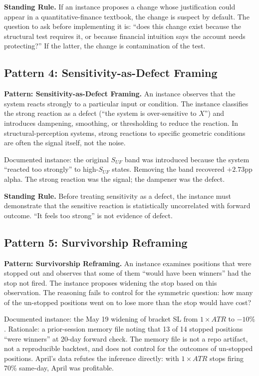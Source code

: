 \documentclass[11pt, a4paper]{article}
\newcommand{\rulebox}[1]{%
  \begin{framed}\noindent\textbf{Standing Rule.} #1\end{framed}}
\newcommand{\patternbox}[2]{%
  \begin{framed}\noindent\textbf{Pattern: #1.} #2\end{framed}}
\theoremstyle{definition}
\begin{document}
\rulebox{If an instance proposes a change whose justification could appear in
a quantitative-finance textbook, the change is suspect by default. The
question to ask before implementing it is: ``does this change exist because
the structural test requires it, or because financial intuition says the
account needs protecting?'' If the latter, the change is contamination of
the test.}

\subsection{Pattern 4: Sensitivity-as-Defect Framing}

\patternbox{Sensitivity-as-Defect Framing}{An instance observes that the
system reacts strongly to a particular input or condition. The instance
classifies the strong reaction as a defect (``the system is over-sensitive
to $X$'') and introduces dampening, smoothing, or thresholding to reduce the
reaction. In structural-perception systems, strong reactions to specific
geometric conditions are often the signal itself, not the noise.}

Documented instance: the original $S_{UF}$ band was introduced because the
system ``reacted too strongly'' to high-$S_{UF}$ states. Removing the band
recovered $+2.73$pp alpha. The strong reaction was the signal; the dampener
was the defect.

\rulebox{Before treating sensitivity as a defect, the instance must
demonstrate that the sensitive reaction is statistically uncorrelated with
forward outcome. ``It feels too strong'' is not evidence of defect.}

\subsection{Pattern 5: Survivorship Reframing}

\patternbox{Survivorship Reframing}{An instance examines positions that were
stopped out and observes that some of them ``would have been winners'' had
the stop not fired. The instance proposes widening the stop based on this
observation. The reasoning fails to control for the symmetric question: how
many of the un-stopped positions went on to lose more than the stop would
have cost?}

Documented instance: the May 19 widening of bracket SL from $1\!\times\!ATR$
to $-10\%$. Rationale: a prior-session memory file noting that 13 of 14
stopped positions ``were winners'' at 20-day forward check. The memory file
is not a repo artifact, not a reproducible backtest, and does not control
for the outcomes of un-stopped positions. April's data refutes the inference
directly: with $1\!\times\!ATR$ stops firing 70\% same-day, April was
profitable.
\end{document}
